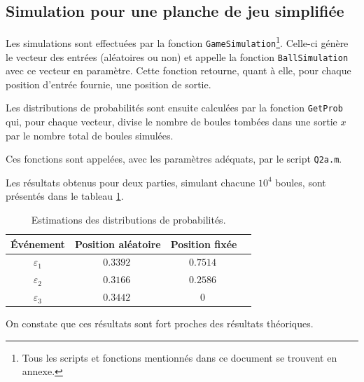 \documentclass[a4paper, 12pt]{article}
\begin{document}
	\subsection{Simulation pour une planche de jeu simplifiée}
	Les simulations sont effectuées par la fonction \texttt{GameSimulation}\footnote{Tous les scripts et fonctions mentionnés dans ce document se trouvent en annexe.}. Celle-ci génère le vecteur des entrées (aléatoires ou non) et appelle la fonction \texttt{BallSimulation} avec ce vecteur en paramètre. Cette fonction retourne, quant à elle, pour chaque position d'entrée fournie, une position de sortie.\par
	Les distributions de probabilités sont ensuite calculées par la fonction \texttt{GetProb} qui, pour chaque vecteur, divise le nombre de boules tombées dans une sortie \(x\) par le nombre total de boules simulées.\par
	Ces fonctions sont appelées, avec les paramètres adéquats, par le script \texttt{Q2a.m}.\par
	Les résultats obtenus pour deux parties, simulant chacune \(10^4\) boules, sont présentés dans le tableau \ref{table:tab_Q2a}.\par
	\begin{table}[!h]
	    \centering
	    \begin{tabular}{|c|c|c|c|}
            \hline
            \textbf{Événement} & \textbf{Position aléatoire} & \textbf{Position fixée}\\
            \hline
            \hline
            \(\varepsilon_1\) & \(\SI{0.3392}{}\) & \(\SI{0.7514}{}\)\\
            \hline
            \(\varepsilon_2\) & \(\SI{0.3166}{}\) & \(\SI{0.2586}{}\)\\
            \hline
            \(\varepsilon_3\) & \(\SI{0.3442}{}\) & \(\SI{0}{}\)\\
            \hline
        \end{tabular}
        \caption{Estimations des distributions de probabilités.}
        \label{table:tab_Q2a}
    \end{table}
    On constate que ces résultats sont fort proches des résultats théoriques.
\end{document}
